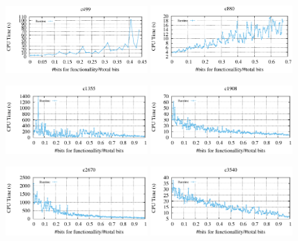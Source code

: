 \documentclass[thesis]{umassthesis}  %
\begin{document}
\begin{figure}[!hbt]
  \centering
    \includegraphics[width=0.48\textwidth]{DEFENSE_DATA/c499.eps} \hspace{.3cm}
    \includegraphics[width=0.48\textwidth]{DEFENSE_DATA/c880.eps} 
    \vspace{-2mm}

    \includegraphics[width=0.48\textwidth]{DEFENSE_DATA/c1355.eps} \hspace{.3cm}
    \includegraphics[width=0.48\textwidth]{DEFENSE_DATA/c1908.eps} 
        \vspace{-2mm}

    \includegraphics[width=0.48\textwidth]{DEFENSE_DATA/c2670.eps} \hspace{.3cm}
    \includegraphics[width=0.48\textwidth]{DEFENSE_DATA/c3540.eps}
        \vspace{-2mm}


\end{figure}
\end{document}
